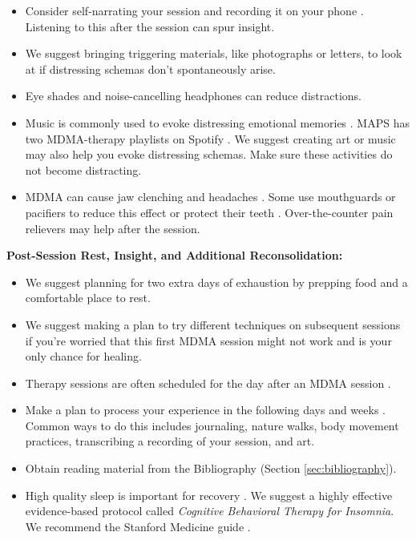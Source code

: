 \documentclass[12pt,letterpaper]{article}
\begin{document}
\begin{itemize}
    \item Consider self-narrating your session and recording it on your phone \cite{mithoeferManual}. Listening to this after the session can spur insight.
    \item We suggest bringing triggering materials, like photographs or letters, to look at if distressing schemas don't spontaneously arise. 
    \item Eye shades and noise-cancelling headphones can reduce distractions.
    \item Music is commonly used to evoke distressing emotional memories \cite{mithoeferManual}. MAPS has two MDMA-therapy playlists on Spotify \cite{mapsMusicA,mapsMusicB}. We suggest creating art or music may also help you evoke distressing schemas. Make sure these activities do not become distracting.
    \item MDMA can cause jaw clenching and headaches \cite{mitchellMDMAClinicalTrial2,liechtiGender}. Some use mouthguards or pacifiers to reduce this effect or protect their teeth \cite{emdeEmergency}. Over-the-counter pain relievers may help after the session. 
\end{itemize}
\noindent \textbf{Post-Session Rest, Insight, and Additional Reconsolidation:}
\begin{itemize}
    \item We suggest planning for two extra days of exhaustion by prepping food and a comfortable place to rest. 
    \item We suggest making a plan to try different techniques on subsequent sessions if you're worried that this first MDMA session might not work and is your only chance for healing.
    \item Therapy sessions are often scheduled for the day after an MDMA session \cite{mithoeferManual}. 
    \item Make a plan to process your experience in the following days and weeks \cite{mithoeferManual}. Common ways to do this includes journaling, nature walks, body movement practices, transcribing a recording of your session, and art. 
    \item Obtain reading material from the Bibliography (Section \ref{sec:bibliography}).
    \item High quality sleep is important for recovery \cite{walkerSleep}. We suggest a highly effective evidence-based protocol called \textit{Cognitive Behavioral Therapy for Insomnia}. We recommend the Stanford Medicine guide \cite{stanfordSleep}.
\end{itemize}
\end{document}
